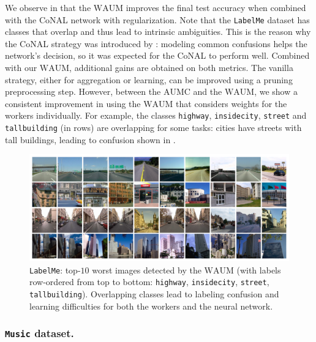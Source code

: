 We observe in  that the $\mathrm{WAUM}$ improves the final test accuracy when combined with the CoNAL network with regularization.
Note that the \texttt{LabelMe} dataset has classes that overlap and thus lead to intrinsic ambiguities.
This is the reason why the CoNAL strategy was introduced by \citet{chu2021learning}: modeling common confusions helps the network's decision, so it was expected for the CoNAL to perform well.
Combined with our $\mathrm{WAUM}$, additional gains are obtained on both metrics.
The vanilla strategy, either for aggregation or learning, can be improved using a pruning preprocessing step.
However, between the $\mathrm{AUMC}$ and the $\mathrm{WAUM}$, we show a consistent improvement in using the $\mathrm{WAUM}$ that considers weights for the workers individually.
For example, the classes \texttt{highway}, \texttt{insidecity}, \texttt{street} and \texttt{tallbuilding} (in rows) are overlapping for some tasks: cities have streets with tall buildings, leading to confusion shown in .

\begin{figure}[t]
    \centering
    \includegraphics[width=0.9\columnwidth]{images/lowest_labelme_highway_insidecity_street_tallbuilding.pdf}
    \caption{\texttt{LabelMe}: top-$10$ worst images  detected by the $\mathrm{WAUM}$ (with labels row-ordered from top to bottom: \texttt{highway}, \texttt{insidecity}, \texttt{street}, \texttt{tallbuilding}). Overlapping classes lead to labeling confusion and learning difficulties for both the workers and the neural network.}
    \label{fig:worse_labelme}
\end{figure}

\subsubsection*{\texttt{Music} dataset.}


